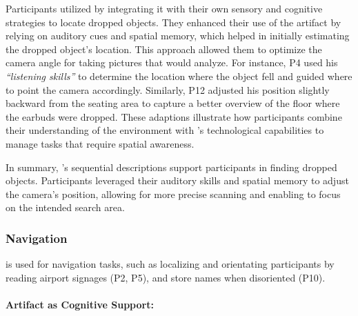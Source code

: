 Participants utilized \bma{} by integrating it with their own sensory and cognitive strategies to locate dropped objects. They enhanced their use of the artifact by relying on auditory cues and spatial memory, which helped in initially estimating the dropped object's location. This approach allowed them to optimize the camera angle for taking pictures that \bma{} would analyze. 
For instance, P4 used his \textit{``listening skills''} to determine the location where the object fell and guided where to point the camera accordingly. 
% 
Similarly, P12 adjusted his position slightly backward from the seating area to capture a better overview of the floor where the earbuds were dropped. 
% 
These adaptions illustrate how participants combine their understanding of the environment with \bma's technological capabilities to manage tasks that require spatial awareness.


In summary, \bma's sequential descriptions support participants in finding dropped objects. Participants leveraged their auditory skills and spatial memory to adjust the camera's position, allowing for more precise scanning and enabling \bma{} to focus on the intended search area.




\subsubsection{Navigation}
\label{navigation}
\bma{} is used for navigation tasks, such as localizing and orientating participants by reading airport signages (P2, P5), and store names when disoriented (P10). 
% 



\paragraph{Artifact as Cognitive Support:}

